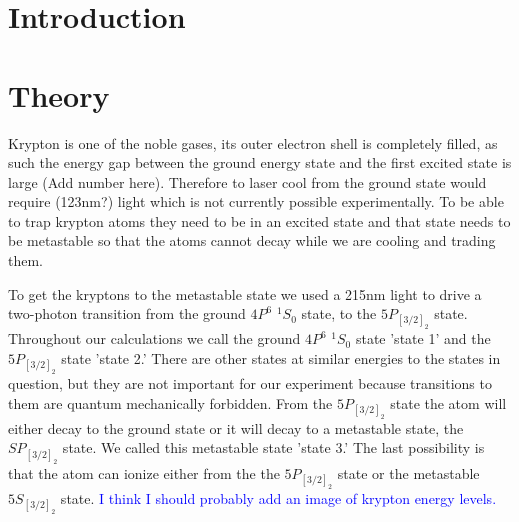 \documentclass[prb,preprint]{revtex4-1}
\begin{document}
\title{}


\author{Danika Luntz-Martin}

\author{William Williams}

\date{\today}

\begin{abstract}


\end{abstract}


\maketitle 


\section{Introduction} 


\section{Theory}

Krypton is one of the noble gases, its outer electron shell is completely filled, as such the energy gap between the ground energy state and the first excited state is large (Add number here). Therefore to laser cool from the ground state would require (123nm?) light which is not currently possible experimentally. To be able to trap krypton atoms they need to be in an excited state and that state needs to be metastable so that the atoms cannot decay while we are cooling and trading them. 

To get the kryptons to the metastable state we used a 215nm light to drive a two-photon transition from the ground $4P^6$ $^1S_0$ state, to the $5P_{[3/2]_2}$ state. Throughout our calculations we call the ground $4P^6$ $^1S_0$ state 'state 1' and the $5P_{[3/2]_2}$ state 'state 2.' There are other states at similar energies to the states in question, but they are not important for our experiment because transitions to them are quantum mechanically forbidden. From the $5P_{[3/2]_2}$ state the atom will either decay to the ground state or it will decay to a metastable state, the $SP_{[3/2]_2}$ state. We called this metastable state 'state 3.' The last possibility is that the atom can ionize either from the the $5P_{[3/2]_2}$ state or the metastable $5S_{[3/2]_2}$ state. \textcolor{blue}{I think I should probably add an image of krypton energy levels.}
\end{document}
